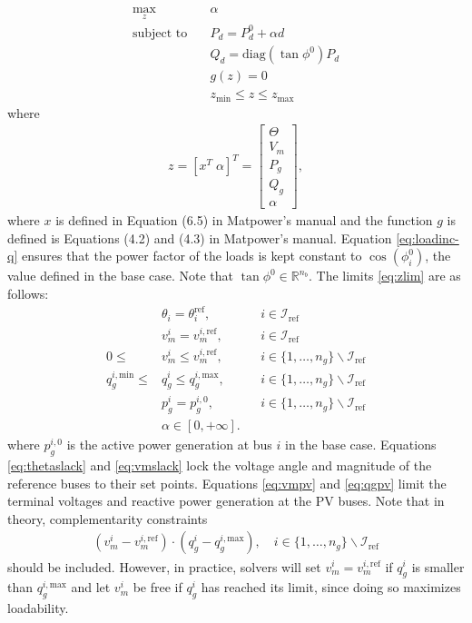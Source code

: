 \documentclass[12pt,a4]{article}
\newcommand*{\field}[1]{\mathbb{#1}}
\newcommand*{\R}{\field{R}} %
\newcommand*{\matpower}{{\sc Matpower}}
\begin{document}
\begin{subequations}\label{eq:maxll}
\begin{align}
  \max_{z} \quad & \alpha \label{eq:maxll-obj} \\
  \text{subject to} \quad & P_d = P_d^0 + \alpha d \label{eq:loadinc}\\
   & Q_d = \text{diag}(\tan \phi^0) P_d \label{eq:loadinc-q}\\
   & g(z) = 0 \\
   & z_\text{min} \leq z \leq z_\text{max} \label{eq:zlim}
\end{align}  
\end{subequations}
where
\begin{align}
  \label{eq:z}
  z = [x^T \; \alpha]^T =  \begin{bmatrix}
    \Theta \\
    V_m \\
    P_g \\
    Q_g \\
    \alpha
  \end{bmatrix},
\end{align}
where $x$ is defined in Equation (6.5) in \matpower{}'s manual and the function $g$ is defined is Equations (4.2) and (4.3) in \matpower{}'s manual.
Equation \eqref{eq:loadinc-q} ensures that the power factor of the loads is kept constant to $\cos(\phi_i^0)$, the value defined in the base case.
Note that $\tan \phi^0 \in \R^{n_b}$.
The limits \eqref{eq:zlim} are as follows:
\begin{align}
  & \theta_i = \theta_i^\text{ref}, && i \in \mathcal{I}_\text{ref} \label{eq:thetaslack} \\
  & v_m^{i} = v_m^{i,\text{ref}}, && i \in \mathcal{I}_\text{ref} \label{eq:vmslack} \\
  0 \leq & v_m^{i} \leq v_m^{i,\text{ref}}, && i \in \{1,\ldots,n_g\} \backslash \mathcal{I}_\text{ref} \label{eq:vmpv} \\
  q_g^{i,\text{min}} \leq & q_g^i \leq q_g^{i,\text{max}}, && i \in \{1,\ldots,n_g\} \backslash \mathcal{I}_\text{ref} \label{eq:qgpv}\\
  & p_g^i = p_g^{i,0}, && i \in \{1,\ldots,n_g\} \backslash \mathcal{I}_\text{ref} \\
  & \alpha \in [0,+\infty].
\end{align}
where $p_g^{i,0}$ is the active power generation at bus $i$ in the base case.
Equations \eqref{eq:thetaslack} and \eqref{eq:vmslack} lock the voltage angle and magnitude of the reference buses to their set points.
Equations \eqref{eq:vmpv} and \eqref{eq:qgpv} limit the terminal voltages and reactive power generation at the PV buses. 
Note that in theory, complementarity constraints
\begin{align}
  \label{eq:comp-constr}
  (v_m^i-v_m^{i,\text{ref}})\cdot(q_g^i-q_g^{i,\text{max}}), \quad i \in \{1,\ldots,n_g\} \backslash \mathcal{I}_\text{ref}
\end{align}
should be included. 
However, in practice, solvers will set $v_m^i = v_m^{i,\text{ref}}$ if $q_g^i$ is smaller than $q_g^{i,\text{max}}$ and let $v_m^i$ be free if $q_g^i$ has reached its limit, since doing so maximizes loadability.
\end{document}
